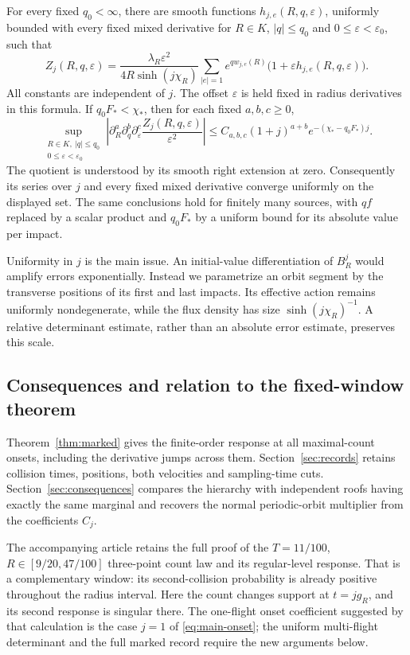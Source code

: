 \begin{theorem}\label{thm:marked}
For every fixed $q_0<\infty$, there are smooth functions
$h_{j,e}(R,q,\varepsilon)$, uniformly bounded with every fixed mixed
derivative for $R\in K$, $|q|\le q_0$ and
$0\le\varepsilon<\varepsilon_0$, such that
\begin{equation}\label{eq:marked-onset}
 Z_j(R,q,\varepsilon)=
 \frac{\lambda_R\varepsilon^2}{4R\sinh(j\chi_R)}
 \sum_{|e|=1} e^{q w_{j,e}(R)}
           \bigl(1+\varepsilon h_{j,e}(R,q,\varepsilon)\bigr).
\end{equation}
All constants are independent of $j$. The offset $\varepsilon$ is held
fixed in radius derivatives in this formula. If $q_0F_*<\chi_*$, then
for each fixed $a,b,c\ge0$,
\begin{equation}\label{eq:summable}
 \sup_{\substack{R\in K,\ |q|\le q_0\\0\le\varepsilon<\varepsilon_0}}
 \left|\partial_R^a\partial_q^b\partial_\varepsilon^c
       \frac{Z_j(R,q,\varepsilon)}{\varepsilon^2}\right|
 \le C_{a,b,c}(1+j)^{a+b}
           e^{-(\chi_*-q_0F_*)j}.
\end{equation}
The quotient is understood by its smooth right extension at zero.
Consequently its series over $j$ and every fixed mixed derivative
converge uniformly on the displayed set. The same conclusions hold
for finitely many sources, with $qf$ replaced by a scalar product and
$q_0F_*$ by a uniform bound for its absolute value per impact.
\end{theorem}

Uniformity in $j$ is the main issue. An initial-value differentiation
of $B_R^j$ would amplify errors exponentially. Instead we parametrize
an orbit segment by the transverse positions of its first and last
impacts. Its effective action remains uniformly nondegenerate, while
the flux density has size $\sinh(j\chi_R)^{-1}$. A relative determinant
estimate, rather than an absolute error estimate, preserves this scale.

\subsection{Consequences and relation to the fixed-window theorem}
Theorem~\ref{thm:marked} gives the finite-order response at all maximal-count
onsets, including the derivative jumps across them. Section~\ref{sec:records}
retains collision times, positions, both velocities and sampling-time cuts.
Section~\ref{sec:consequences} compares the hierarchy with independent roofs
having exactly the same marginal and recovers the normal periodic-orbit
multiplier from the coefficients $C_j$.

The accompanying article \cite{TC} retains the full proof of the
$T=11/100$, $R\in[9/20,47/100]$ three-point count law and its regular-level
response. That is a complementary window: its second-collision probability
is already positive throughout the radius interval. Here the count changes
support at $t=jg_R$, and its second response is singular there. The
one-flight onset coefficient suggested by that calculation is the case
$j=1$ of \eqref{eq:main-onset}; the uniform multi-flight determinant and
the full marked record require the new arguments below.
